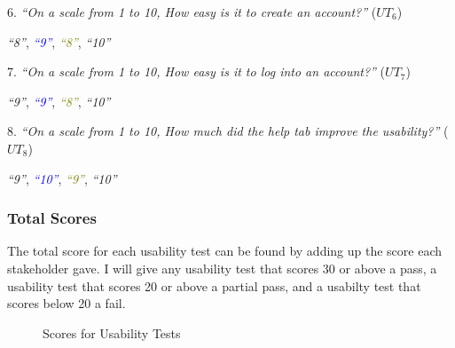 \documentclass[12pt]{report}
\begin{document}
6. \textit{``On a scale from 1 to 10, How easy is it to create an account?''} ($UT_{6}$)
\begin{flushright}
\textit{\textcolor{Sepia}{``8''}}, \textit{\textcolor{Blue}{``9''}}, \textit{\textcolor{olive}{``8''}}, \textit{\textcolor{OliveGreen}{``10''}}
\end{flushright}
7. \textit{``On a scale from 1 to 10, How easy is it to log into an account?''} ($UT_{7}$)
\begin{flushright}
\textit{\textcolor{Sepia}{``9''}}, \textit{\textcolor{Blue}{``9''}}, \textit{\textcolor{olive}{``8''}}, \textit{\textcolor{OliveGreen}{``10''}}
\end{flushright}
8. \textit{``On a scale from 1 to 10, How much did the help tab improve the usability?''} ($UT_{8}$)
\begin{flushright}
\textit{\textcolor{Sepia}{``9''}}, \textit{\textcolor{Blue}{``10''}}, \textit{\textcolor{olive}{``9''}}, \textit{\textcolor{OliveGreen}{``10''}}
\end{flushright}

\subsubsection{Total Scores}
The total score for each usability test can be found by adding up the score each stakeholder gave. I will give any usability test that scores 30 or above a pass, a usability test that scores 20 or above a partial pass, and a usabilty test that scores below 20 a fail.
\usabilitytests
\begin{figure}[H]
\centering
{}
\caption{Scores for Usability Tests}\label{fig:usabilityTests}
\end{figure}
\end{document}
